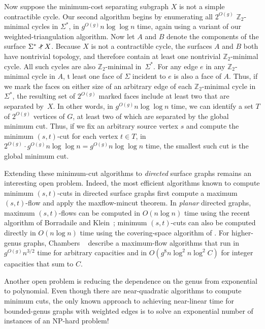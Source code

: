 \documentclass[natbib]{svcyclop}
\def\Z{\mathbb{Z}}
\def\snip{\mathbin{\raisebox{0.15ex}{\rotatebox[origin=c]{60}{\Rightscissors}\!}}}
\def\snip{\mathbin{\raisebox{0.15ex}{\rotatebox[origin=c]{60}{\Rightscissors}\!}}}
\begin{document}
Now suppose the minimum-cost separating subgraph $X$ is not a simple contractible cycle.  Our second algorithm begins by enumerating all $2^{O(g)}$ $\Z_2$-minimal cycles in $\Sigma^*$, in $g^{O(g)}n\log\log n$ time, again using a variant of our weighted-triangulation algorithm.  Now let $A$ and $B$ denote the components of the surface $\Sigma^*\snip X$.  Because $X$ is not a contractible cycle, the surfaces $A$ and $B$ both have nontrivial topology, and therefore contain at least one nontrivial $\Z_2$-minimal cycle.  All such cycles are also $\Z_2$-minimal in~$\Sigma^*$.  For any edge $e$ in any $\Z_2$-minimal cycle in $A$, t least one face of $\Sigma$ incident to $e$ is also a face of $A$.  Thus, if we mark the faces on either size of an arbitrary edge of each $\Z_2$-minimal cycle in $\Sigma^*$, the resulting set of $2^{O(g)}$ marked faces include at least two that are separated by~$X$.  In other words, in $g^{O(g)}n\log\log n$ time, we can identify a set $T$ of $2^{O(g)}$ vertices of $G$, at least two of which are separated by the global minimum cut.  Thus, if we fix an arbitrary source vertex $s$ and compute the minimum $(s,t)$-cut for each vertex $t\in T$, in $2^{O(g)}\cdot g^{O(g)}n\log\log n = g^{O(g)}n\log\log n$ time, the smallest such cut is the global minimum cut.




\OpenProb

Extending these minimum-cut algorithms to \emph{directed} surface graphs remains an interesting open problem.  Indeed, the most efficient algorithms known to compute minimum $(s,t)$-cuts in directed surface graphs first compute a maximum $(s,t)$-flow and apply the maxflow-mincut theorem.  In \emph{planar} directed graphs, maximum $(s,t)$-flows can be computed in $O(n\log n)$ time using the recent algorithm of Borradaile and Klein~\cite{bk-amfdp-09}; minimum $(s,t)$-cuts can also be computed directly in $O(n\log n)$ time using the covering-space algorithm of \citet{wobble}.  For higher-genus graphs, Chambers \etal~\cite{surflow} describe a  maximum-flow algorithms that run in $g^{O(g)}n^{3/2}$ time for arbitrary capacities and in $O(g^8 n\log^2 n \log^2 C)$ for integer capacities that sum to $C$.

Another open problem is reducing the dependence on the genus from exponential to polynomial.  Even though there are near-quadratic algorithms to compute minimum cuts, the only known approach to achieving near-linear time for bounded-genus graphs with weighted edges is to solve an exponential number of instances of an NP-hard problem!
\end{document}
